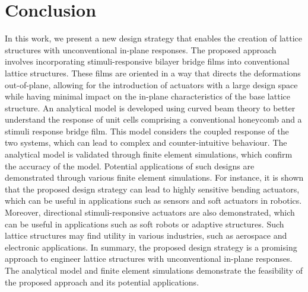 \documentclass[final,times,5p]{elsarticle}
\numberwithin{equation}{section}
\begin{document}
\section{Conclusion}

In this work, we present a new design strategy that enables the creation of lattice structures with unconventional in-plane responses. The proposed approach involves incorporating stimuli-responsive bilayer bridge films into conventional lattice structures. These films are oriented in a way that directs the deformations out-of-plane, allowing for the introduction of actuators with a large design space while having minimal impact on the in-plane characteristics of the base lattice structure.
An analytical model is developed using curved beam theory to better understand the response of unit cells comprising a conventional honeycomb and a stimuli response bridge film. This model considers the coupled response of the two systems, which can lead to complex and counter-intuitive behaviour. The analytical model is validated through finite element simulations, which confirm the accuracy of the model.
Potential applications of such designs are demonstrated through various finite element simulations. For instance, it is shown that the proposed design strategy can lead to highly sensitive bending actuators, which can be useful in applications such as sensors and soft actuators in robotics. Moreover, directional stimuli-responsive actuators are also demonstrated, which can be useful in applications such as soft robots or adaptive structures. Such lattice structures may find utility in various industries, such as aerospace and electronic applications. In summary, the proposed design strategy is a promising approach to engineer lattice structures with unconventional in-plane responses. The analytical model and finite element simulations demonstrate the feasibility of the proposed approach and its potential applications.



\end{document}
